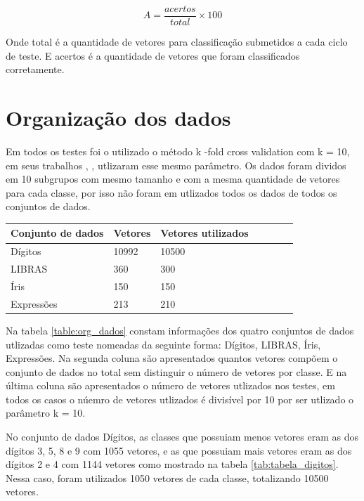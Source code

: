 $$A = \frac{acertos}{total}\times 100$$

Onde total é a quantidade de vetores para classificação submetidos a cada ciclo de teste. E acertos é a quantidade de vetores que foram classificados corretamente.

\section{Organização dos dados}
Em todos os testes foi o utilizado o método k -fold cross validation com k = 10, em seus trabalhos , ,  utlizaram esse mesmo parâmetro. Os dados foram dividos em 10 subgrupos com mesmo tamanho \cite{Guo} e com a mesma quantidade de vetores para cada classe, por isso não foram em utlizados todos os dados de todos os conjuntos de dados.

\begin{center}
	\begin{tabular}{|l|l|l|l|p{3cm}|p{3cm}|p{2cm}|}
        \hline
        Conjunto de dados & Vetores & Vetores utilizados\\ \hline
		Dígitos    &10992  & 10500 \\ \hline
		LIBRAS     & 360   & 300   \\ \hline
		Íris       & 150   & 150   \\ \hline
		Expressões & 213   & 210   \\ \hline
	\end{tabular}
	\label{table:org_dados}
\end{center}

Na tabela \ref{table:org_dados} constam informações dos quatro conjuntos de dados utlizadas como teste nomeadas da seguinte forma: Dígitos, LIBRAS, Íris, Expressões. Na segunda coluna são apresentados quantos vetores compõem o conjunto de dados no total sem distinguir o número de vetores por classe. E na última coluna são apresentados o número de vetores utlizados nos testes, em todos os casos o núemro de vetores utlizados é divisível por 10 por ser utlizado o parâmetro k = 10.

No conjunto de dados Dígitos, as classes que possuiam menos vetores eram as dos dígitos 3, 5, 8 e 9 com 1055 vetores, e as que possuiam mais vetores eram as dos dígitos 2 e 4 com 1144 vetores como mostrado na tabela \ref{tab:tabela_digitos}. Nessa caso, foram utilizados 1050 vetores de cada classe, totalizando 10500 vetores.

